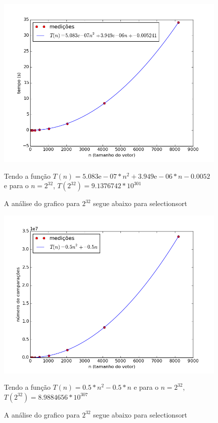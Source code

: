 \documentclass[12pt,a4paper,twoside]{report}
\begin{document}


\begin{figure}[ht]
\centering \includegraphics[scale=0.8]{../selectionsort/imagens/selectionsortAleatorio0.png}
\caption{A análise do grafico para $2^{32}$ segue abaixo para selectionsort}

Tendo a função $T(n) = 5.083\mathrm{e}-07*n^{2}+3.949\mathrm{e}-06*n-0.0052$ e para o $n =2^{32}$, $T(2^{32}) = 9.1376742 * 10^{301}$
\label{fig:selectionsortAleatorio0}
\end{figure}

\begin{figure}[ht]
\centering \includegraphics[scale=0.8]{../selectionsort/imagens/selectionsortAleatorio1.png}
\caption{A análise do grafico para $2^{32}$ segue abaixo para selectionsort}

Tendo a função $T(n) = 0.5*n^{2}-0.5*n$ e para o $n =2^{32}$, $T(2^{32}) =8.9884656 * 10^{307}$
\label{fig:selectionsortAleatorio1}
\end{figure}
\end{document}
